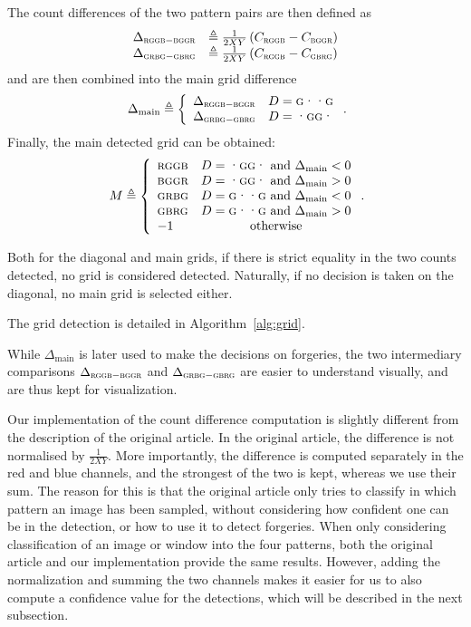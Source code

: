 \documentclass{ipol}
\begin{document}
The count differences of the two pattern pairs are then defined as
\[\begin{array}{ll}
        \Delta_{\textsc{rggb}-\textsc{bggr}} &\triangleq \frac 1 {2XY}\left( C_{\textsc{rggb}} - C_{\textsc{bggr}}\right)\\
\Delta_{\textsc{grbg}-\textsc{gbrg}} &\triangleq \frac 1 {2XY}\left(C_{\textsc{rggb}} - C_{\textsc{gbrg}}\right)\end{array}\]
and are then combined into the main grid difference
\[\phantom.\Delta_{\mathrm{main}}\triangleq\left\{\begin{array}{lc}
        \Delta_{\textsc{rggb}-\textsc{bggr}}&D=\textsc{g··g}\\
\Delta_{\textsc{grbg}-\textsc{gbrg}}&D=\textsc{·gg·}\end{array}\right..\]
Finally, the main detected grid can be obtained:
\[\phantom.M \triangleq \left\{\begin{array}{lc}
        \textsc{rggb}&D=\textsc{·gg·}\text{ and }\Delta_{\mathrm{main}}<0\\
        \textsc{bggr}&D=\textsc{·gg·}\text{ and }\Delta_{\mathrm{main}}>0\\
        \textsc{grbg}&D=\textsc{g··g}\text{ and }\Delta_{\mathrm{main}}<0\\
        \textsc{gbrg}&D=\textsc{g··g}\text{ and }\Delta_{\mathrm{main}}>0\\
-1&\text{otherwise}\end{array}\right..\]

Both for the diagonal and main grids, if there is strict equality in the two counts detected, no grid is considered detected. Naturally, if no decision is taken on the diagonal, no main grid is selected either.

The grid detection is detailed in Algorithm~\ref{alg:grid}.

While $\Delta_{\mathrm{main}}$ is later used to make the decisions on forgeries, the two intermediary comparisons $\Delta_{\textsc{rggb}-\textsc{bggr}}$ and $\Delta_{\textsc{grbg}-\textsc{gbrg}}$ are easier to understand visually, and are thus kept for visualization.

Our implementation of the count difference computation is slightly different from the description of the original article. In the original article, the difference is not normalised by $\frac 1 {2XY}$. More importantly, the difference is computed separately in the red and blue channels, and the strongest of the two is kept, whereas we use their sum.
The reason for this is that the original article only tries to classify in which pattern an image has been sampled, without considering how confident one can be in the detection, or how to use it to detect forgeries. When only considering classification of an image or window into the four patterns, both the original article and our implementation provide the same results. However, adding the normalization and summing the two channels makes it easier for us to also compute a confidence value for the detections, which will be described in the next subsection.
\end{document}
